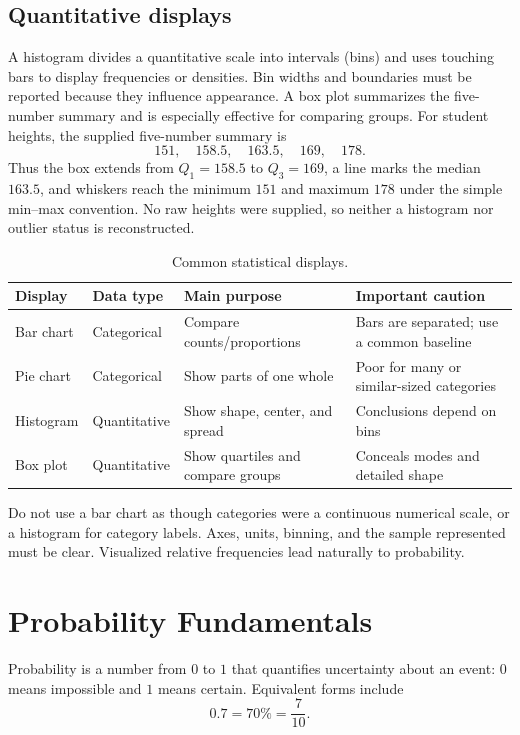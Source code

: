\documentclass[11pt]{article}
\begin{document}
\subsection{Quantitative displays}
A histogram divides a quantitative scale into intervals (bins) and uses
touching bars to display frequencies or densities.  Bin widths and boundaries
must be reported because they influence appearance.  A box plot summarizes
the five-number summary and is especially effective for comparing groups.
For student heights, the supplied five-number summary is
\[
151,\quad158.5,\quad163.5,\quad169,\quad178.
\]
Thus the box extends from $Q_1=158.5$ to $Q_3=169$, a line marks the median
$163.5$, and whiskers reach the minimum $151$ and maximum $178$ under the
simple min--max convention.  No raw heights were supplied, so neither a
histogram nor outlier status is reconstructed.

\begin{table}[ht]
\centering
\caption{Common statistical displays.}\label{tab:graphs}
\begin{tabularx}{\textwidth}{@{}lYYY@{}}
\toprule
Display & Data type & Main purpose & Important caution \\
\midrule
Bar chart & Categorical & Compare counts/proportions & Bars are separated; use a common baseline \\
Pie chart & Categorical & Show parts of one whole & Poor for many or similar-sized categories \\
Histogram & Quantitative & Show shape, center, and spread & Conclusions depend on bins \\
Box plot & Quantitative & Show quartiles and compare groups & Conceals modes and detailed shape \\
\bottomrule
\end{tabularx}
\end{table}

\begin{keybox}
Do not use a bar chart as though categories were a continuous numerical
scale, or a histogram for category labels.  Axes, units, binning, and the
sample represented must be clear.  Visualized relative frequencies lead
naturally to probability.
\end{keybox}

\section{Probability Fundamentals}\label{sec:probability}
Probability is a number from $0$ to $1$ that quantifies uncertainty about an
event: $0$ means impossible and $1$ means certain.  Equivalent forms include
\[
0.7=70\%=\frac{7}{10}.
\]
\end{document}
